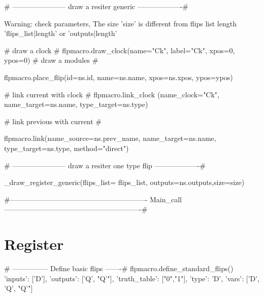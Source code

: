 {%
{%
{%
{# -----------------------
 draw a resiter generic
-------------------#}
{%

{%
 Warning: check parameters, The size '{{size}}' is different from flips list length '{{flips_list|length}}' or
 '{{outputs|length}}'
{%
    {# draw a clock #}
    {{ flpmacro.draw_clock(name="Ck", label="Ck", xpos=0, ypos=0)}}
    {# draw a modules #}
    {%
    {%
    {%
        {%
        {%
        {%
        {%
        {{ flpmacro.place_flip(id=ns.id, name=ns.name, xpos=ns.xpos, ypos=ypos)}}

        {# link current with clock #}
        {{ flpmacro.link_clock (name_clock="Ck", name_target=ns.name, type_target=ns.type)}}

        {# link previous with current #}
        {%
            {{ flpmacro.link(name_source=ns.prev_name, name_target=ns.name, type_target=ns.type, method="direct")}}
        {%
        {%
        {%
    {%

{%
{%


{# -----------------------
 draw a resiter one type flip
-------------------#}
{%
{%
{%
{%
    {%
{%
{{ _draw_register_generic(flips_list= flips_list, outputs=ns.outputs,size=size)}}

{%

{#----------------------------------------------------------
 Main_call
----------------------------------------------------------#}
\section{Register}

{#  --------------- Define basic flips -------#}
{{flpmacro.define_standard_flips()}}
{%
       'inputs': ['D'],
       'outputs': ['Q', "Q'"],
       'truth_table': ["0","1"],
       'type': 'D',
       'vars': ['D', 'Q', "Q'"]} %
{%

}}}}}}}}}}}}}}}}}}}}}}}}}}}}
